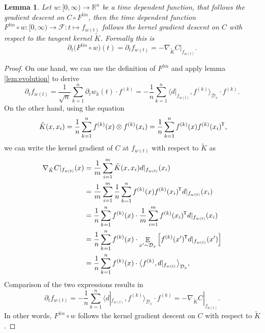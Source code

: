 \documentclass[11pt, a4paper]{article}
\newtheorem{lemma}[theorem]{Lemma}
\newcommand{\R}{\mathbb{R}}
\newcommand{\D}{\mathcal{D}}
\newcommand{\F}{\mathcal{F}}
\newcommand*{\tr}{^{\mkern-1.5mu\mathsf{T}}}
\DeclareMathOperator*{\E}{\mathbb{E}}
\begin{document}
\begin{lemma} \label{lem:tk}
Let $w: [0, \infty) \to \R^n$ be a time dependent function, that follows the gradient descent on $C \circ F^\textit{lin}$, then the time dependent function $F^\textit{lin} \circ w : [0, \infty) \to \F : t \mapsto f_{w(t)}$ follows the kernel gradient descent on $C$ with respect to the tangent kernel $\tilde{K}$. Formally this is
\[ \partial_t \big (F^\textit{lin} \circ w \big )(t) = \partial_tf_{w(t)} = -\nabla_{\tilde{K}}C|_{f_{w(t)}}. \]
\end{lemma}

\begin{proof}
On one hand, we can use the definition of $F^\textit{lin}$ and apply lemma \ref{lem:evolution} to derive
\[ \partial_tf_{w(t)} = \frac{1}{\sqrt{n}} \sum_{k=1}^{n} \partial_t w_k(t) \cdot f^{(k)} = - \frac{1}{n} \sum_{k=1}^{n} \big \langle d|_{f_{w(t)}}, f^{(k)} \big \rangle_{\D_x} \cdot f^{(k)}. \]
On the other hand, using the equation
\[ \tilde{K}(x,x_i) = \frac{1}{n} \sum_{k=1}^{n}f^{(k)}(x) \otimes f^{(k)}(x_i) = \frac{1}{n} \sum_{k=1}^{n}f^{(k)}(x) f^{(k)}(x_i) \tr, \]
we can write the kernel gradient of $C$ at $f_{w(t)}$ with respect to $\tilde{K}$ as
\[ \begin{split}
\nabla_{\tilde{K}} C|_{f_{w(t)}}(x)
&= \frac{1}{m} \sum_{i=1}^{m} \tilde{K}(x,x_i)d|_{f_{w(t)}}(x_i) \\\
&= \frac{1}{m} \sum_{i=1}^{m} \frac{1}{n} \sum_{k=1}^{n}f^{(k)}(x) f^{(k)}(x_i) \tr d|_{f_{w(t)}}(x_i) \\\
&= \frac{1}{n} \sum_{k=1}^{n} f^{(k)}(x) \cdot \frac{1}{m} \sum_{i=1}^{m} f^{(k)}(x_i) \tr  d|_{f_{w(t)}}(x_i) \\\
&= \frac{1}{n} \sum_{k=1}^{n} f^{(k)}(x) \cdot \E_{x' \sim \D_x} \Big [ f^{(k)}(x')\tr  d|_{f_{w(t)}}(x') \Big ] \\\
&= \frac{1}{n} \sum_{k=1}^{n} f^{(k)}(x) \cdot \big \langle f^{(k)}, d|_{f_{w(t)}} \big \rangle_{\D_x},
\end{split} \]
Comparison of the two expressions results in
\[ \partial_tf_{w(t)} = - \frac{1}{n} \sum_{k=1}^{n} \big \langle d|_{f_{w(t)}}, f^{(k)} \big \rangle_{\D_x} \cdot f^{(k)} = -\nabla_{\tilde{K}} C|_{f_{w(t)}}. \]
In other words, $F^\textit{lin} \circ w$ follows the kernel gradient descent on $C$ with respect to $\tilde{K}$.
\end{proof}
\end{document}
